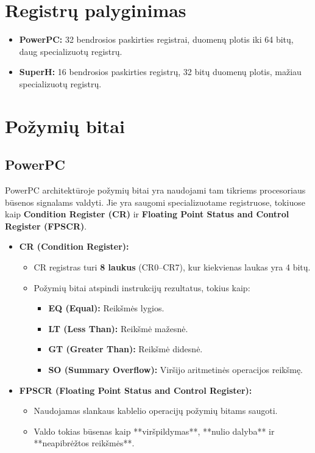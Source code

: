 \documentclass{article}
\begin{document}
\section*{Registrų palyginimas}
\begin{itemize}
    \item \textbf{PowerPC:} 32 bendrosios paskirties registrai, duomenų plotis iki 64 bitų, daug specializuotų registrų.
    \item \textbf{SuperH:} 16 bendrosios paskirties registrų, 32 bitų duomenų plotis, mažiau specializuotų registrų.
\end{itemize}

\section{Požymių bitai}
\subsection{PowerPC}
PowerPC architektūroje požymių bitai yra naudojami tam tikriems procesoriaus būsenos signalams valdyti. Jie yra saugomi specializuotame registruose, tokiuose kaip \textbf{Condition Register (CR)} ir \textbf{Floating Point Status and Control Register (FPSCR)}.

\begin{itemize}
    \item \textbf{CR (Condition Register):}
        \begin{itemize}
            \item CR registras turi \textbf{8 laukus} (CR0–CR7), kur kiekvienas laukas yra 4 bitų.
            \item Požymių bitai atspindi instrukcijų rezultatus, tokius kaip:
                \begin{itemize}
                    \item \textbf{EQ (Equal):} Reikšmės lygios.
                    \item \textbf{LT (Less Than):} Reikšmė mažesnė.
                    \item \textbf{GT (Greater Than):} Reikšmė didesnė.
                    \item \textbf{SO (Summary Overflow):} Viršijo aritmetinės operacijos reikšmę.
                \end{itemize}
        \end{itemize}
    \item \textbf{FPSCR (Floating Point Status and Control Register):}
        \begin{itemize}
            \item Naudojamas slankaus kablelio operacijų požymių bitams saugoti.
            \item Valdo tokias būsenas kaip **viršpildymas**, **nulio dalyba** ir **neapibrėžtos reikšmės**.
        \end{itemize}
\end{itemize}
\end{document}
